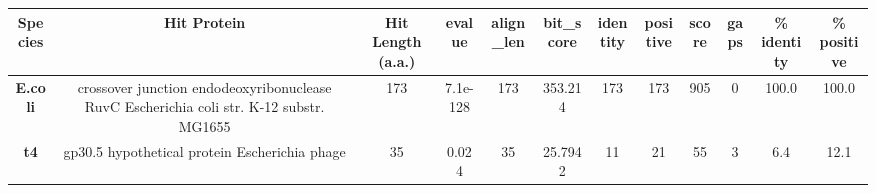 \begin{tabular}{|c|c|c|c|c|c|c|c|c|c|c|c|} \hline
\textbf{Species} & \textbf{Hit Protein} & \textbf{Hit Length (a.a.)} & \textbf{evalue} & \textbf{align\_len} & \textbf{bit\_score} & \textbf{identity} & \textbf{positive} & \textbf{score} & \textbf{gaps} & \textbf{\% identity} & \textbf{\% positive} \\ \hline
\textbf{E.coli} & crossover junction endodeoxyribonuclease RuvC Escherichia coli str. K-12 substr. MG1655 & 173 & 7.1e-128 & 173 & 353.214 & 173 & 173 & 905 & 0 & 100.0 & 100.0\\
\textbf{t4} & gp30.5 hypothetical protein Escherichia phage  & 35 & 0.024 & 35 & 25.7942 & 11 & 21 & 55 & 3 & 6.4 & 12.1\\
\hline \end{tabular}

